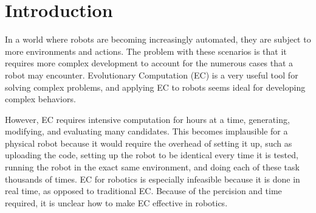 \documentclass{sig-alternate}
\newcommand{\mycomment}[1]{\textcolor{red}{#1}}
\begin{document}




	
\section{Introduction}
 In a world where robots are becoming increasingly automated, they are subject to more environments and actions. The problem with these scenarios is that it requires more complex development to account for the numerous cases that a robot may encounter. Evolutionary Computation (EC) is a very useful tool for solving complex problems, and applying EC to robots seems ideal for developing complex behaviors.
 
 However, EC requires intensive computation for hours at a time, generating, modifying, and evaluating many candidates. This becomes implausible for a physical robot because it would require the overhead of setting it up, such as uploading the code, setting up the robot to be identical every time it is tested, running the robot in the exact same environment, and doing each of these task  thousands of times. EC for robotics is especially infeasible because it is done in real time, as opposed to traditional EC. Because of the percision and time required, it is unclear how to make EC effective in robotics.
 
\end{document}
